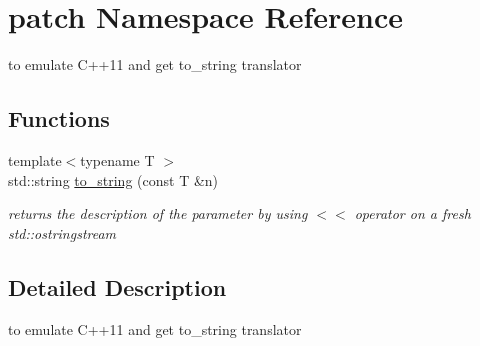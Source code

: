\hypertarget{namespacepatch}{\section{patch Namespace Reference}
\label{namespacepatch}
}


to emulate C++11 and get to\-\_\-string translator  


\subsection*{Functions}
\begin{DoxyCompactItemize}
\item 
\hypertarget{namespacepatch_a54d2400c78aef13e3748a87cd7c86ede}{{\footnotesize template$<$typename T $>$ }\\std\-::string \hyperlink{namespacepatch_a54d2400c78aef13e3748a87cd7c86ede}{to\-\_\-string} (const T \&n)}\label{namespacepatch_a54d2400c78aef13e3748a87cd7c86ede}

\begin{DoxyCompactList}\small\item\em returns the description of the parameter by using $<$$<$ operator on a fresh std\-::ostringstream \end{DoxyCompactList}\end{DoxyCompactItemize}


\subsection{Detailed Description}
to emulate C++11 and get to\-\_\-string translator 